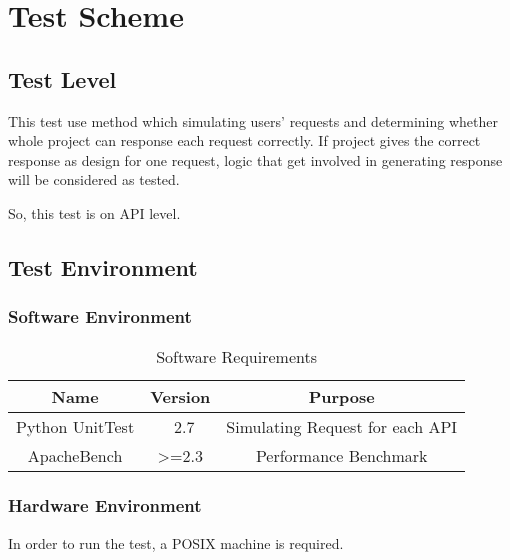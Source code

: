 \section{Test Scheme}
\label{sec:test_scheme}
  \subsection{Test Level}
    This test use method which simulating users' requests
    and determining whether whole project can response each request correctly.
    If project gives the correct response as design for one request, logic that get involved in generating response will be considered as tested.

    So, this test is on API level.

  \subsection{Test Environment}
    \subsubsection{Software Environment}
    \begin{table}[H]
        \begin{tabular}{c|c|c}
          \hline
          Name & Version & Purpose \\ \hline
          Python UnitTest & ~2.7 & Simulating Request for each API \\ \hline
          ApacheBench & >=2.3 & Performance Benchmark \\ \hline
        \end{tabular}
        \caption{Software Requirements\label{tab:Software}}
      \end{table}
    \subsubsection{Hardware Environment}
      In order to run the test, a POSIX machine is required.
